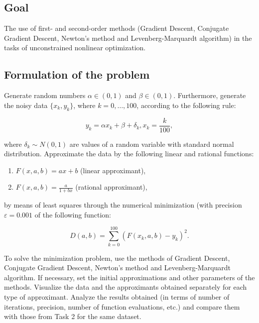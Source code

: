 \newpage
\subsection{Goal}\label{subsec:goal}

The use of first- and second-order methods (Gradient Descent, Conjugate Gradient Descent, Newton's method and Levenberg-Marquardt algorithm) in the tasks of unconstrained nonlinear optimization.

\subsection{Formulation of the problem}\label{subsec:formulation-of-the-problem}

Generate random numbers $\alpha \in (0, 1)$ and $\beta \in (0, 1)$.
Furthermore, generate the noisy data $\{x_k, y_k\}$, where $k = 0, \dots, 100$, according to the following rule:

\begin{equation}
    y_k = \alpha x_k + \beta + \delta_k, x_k = \frac{k}{100},
\end{equation}

where $\delta_k \sim N(0, 1)$ are values of a random variable with standard normal distribution.
Approximate the data by the following linear and rational functions:

\begin{enumerate}
    \item $F(x, a, b) = ax + b$ (linear approximant),
    \item $F(x, a, b) = \frac{a}{1 + bx}$ (rational approximant),
\end{enumerate}

by means of least squares through the numerical minimization (with precision $\varepsilon = 0.001$ of the following function:

\begin{equation}
    D(a, b) = \sum^{100}_{k=0}(F(x_k, a, b) - y_k)^2.
\end{equation}

To solve the minimization problem, use the methods of Gradient Descent, Conjugate Gradient Descent, Newton's method and Levenberg-Marquardt algorithm.
If necessary, set the initial approximations and other parameters of the methods.
Visualize the data and the approximants obtained separately for each type of approximant.
Analyze the results obtained (in terms of number of iterations, precision, number of function evaluations, etc.) and compare them with those from Task 2 for the same dataset.

